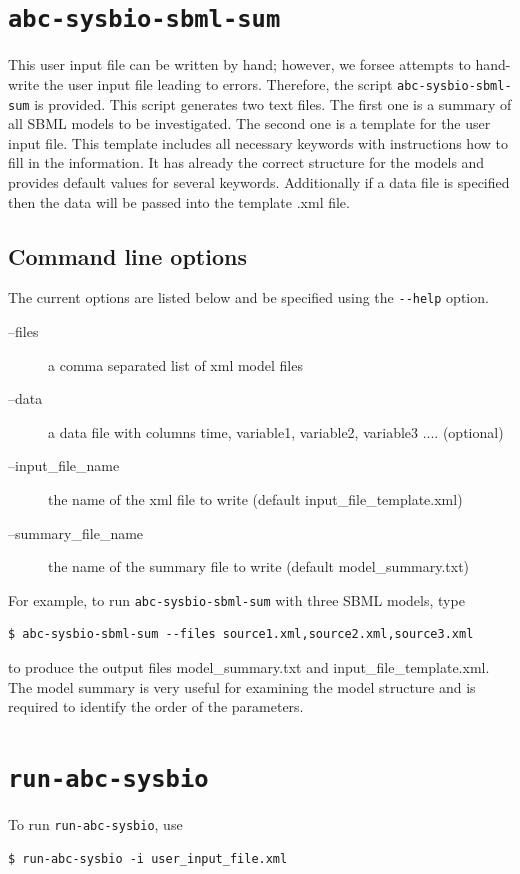 \documentclass[a4paper]{report}
\begin{document}
\section{\texttt{abc-sysbio-sbml-sum}}
This user input file can be written by hand; however, we forsee attempts to hand-write the user input file leading to errors. Therefore, the script \verb$abc-sysbio-sbml-sum$ is provided. This script generates two text files. The first one is a summary of all SBML models to be investigated. The second one is a template for the user input file. This template includes all necessary keywords with instructions how to fill in the information. It has already the correct structure for the models and provides default values for several keywords. Additionally if a data file is specified then the data will be passed into the template .xml file.
\subsection{Command line options}
The current options are listed below and be specified using the \verb$--help$ option.
\begin{description}
\item[--files] a comma separated list of xml model files
\item[--data]  a data file with columns time, variable1, variable2, variable3 .... (optional) 
\item[--input\_file\_name] the name of the xml file to write (default input\_file\_template.xml)
\item[--summary\_file\_name] the name of the summary file to write (default model\_summary.txt)
\end{description}
For example, to run \verb$abc-sysbio-sbml-sum$ with three SBML models, type
\begin{verbatim}
$ abc-sysbio-sbml-sum --files source1.xml,source2.xml,source3.xml
\end{verbatim}
to produce the output files model\_summary.txt and input\_file\_template.xml. The model summary is very useful for examining the model structure and is required to identify the order of the parameters.

\section{\texttt{run-abc-sysbio}}
To run \verb$run-abc-sysbio$, use
\begin{verbatim}
$ run-abc-sysbio -i user_input_file.xml
\end{verbatim}
\end{document}
